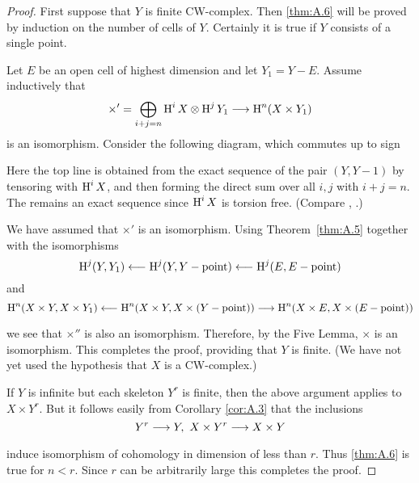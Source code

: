 \documentclass[../main]{subfiles}
\begin{document}
\begin{proof}
First suppose that $Y$ is finite CW-complex. Then \ref{thm:A.6} will be proved by induction on the number of cells of $Y$. Certainly it is true if $Y$ consists of a single point.

Let $E$ be an open cell of highest dimension and let $Y_1 = Y-E$. Assume inductively that \[\times' = \bigoplus_{i+j=n} \homology^i X \otimes \homology^j Y_1 \varrightarrow{} \homology^n (X \times Y_1)\] is an isomorphism. Consider the following diagram, which commutes up to sign

\begin{center}
\end{center}

Here the top line is obtained from the exact sequence of the pair $(Y, Y-1)$ by tensoring with $\operatorname{H}^i X$, and then forming the direct sum over all $i, j$ with $i+j=n$. The remains an exact sequence since $\operatorname{H}^i X$ is torsion free. (Compare \cite[p. 152]{maclane_1975}, \cite[p. 133]{cartan1956homological}.)

We have assumed that $\times'$ is an isomorphism. Using Theorem~\ref{thm:A.5} together with the isomorphisms \[\operatorname{H}^j (Y, Y_1 ) \longleftarrow  \operatorname{H}^j(Y, Y-\text{point}) \longleftarrow  \operatorname{H}^j (E, E-\text{point})\] and \[\homology^n(X\times Y, X\times Y_1) \longleftarrow  \homology^n (X\times Y, X\times (Y-\text{point})) \varrightarrow{} \homology^n (X\times E, X\times (E-\text{point}))\] we see that $\times''$ is also an isomorphism. Therefore, by the Five Lemma, $\times$ is an isomorphism. This completes the proof, providing that $Y$ is finite. (We have not yet used the hypothesis that $X$ is a CW-complex.)

If $Y$ is infinite but each skeleton $Y^r$ is finite, then the above argument applies to $X\times Y^r$. But it follows easily from Corollary \ref{cor:A.3} that the inclusions \[Y^r \varrightarrow{} Y,\,\, X\times Y^r \varrightarrow{} X \times Y\] induce isomorphism of cohomology in dimension of less than $r$. Thus \ref{thm:A.6} is true for $n<r$. Since $r$ can be arbitrarily large this completes the proof.
\end{proof}
\end{document}
